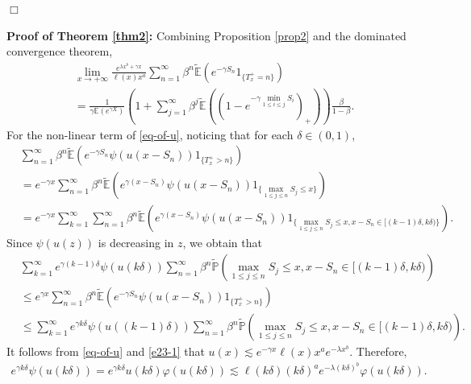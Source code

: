 \documentclass[11pt]{article}
\numberwithin{equation}{section}
\begin{document}
 
 \hfill$\Box$
 

 




\noindent
\textbf{Proof of Theorem \ref{thm2}:}  
Combining Proposition \ref{prop2} and the dominated convergence theorem, 
\begin{align}\label{e23-1}
	& \lim_{x\to+\infty} \frac{e^{\lambda x^b+ \gamma x}}{\ell(x)x^a  } \sum_{n=1}^\infty \beta^{n} \widetilde{\mathbb{E}}\left(e^{-\gamma S_n}1_{\{T_x^+=n\}}\right)\nonumber\\
	& = \frac{1}{\gamma \mathbb{E}(e^{\gamma X})} \left(1+ \sum_{j=1}^{\infty}\beta^j \widetilde{\mathbb{E}}\left( \left(1-e^{-\gamma \min_{1\leq i\leq j} S_i}\right)_+\right) \right)\frac{\beta}{1-\beta}.
\end{align}
For the non-linear term of \eqref{eq-of-u}, noticing that for each $\delta\in (0,1)$,
\begin{align}
	&\sum_{n=1}^\infty \beta^{n}\widetilde{\mathbb{E}}\left(e^{-\gamma S_n} \psi\left(u(x-S_n)\right)1_{\{T_x^+>n\}}\right)\nonumber\\
	&=e^{-\gamma x}\sum_{n=1}^\infty \beta^{n}\widetilde{\mathbb{E}}\left(e^{\gamma (x- S_n)} \psi\left(u(x-S_n)\right)1_{\{\max_{1\leq j \leq n} S_j \leq x\}}\right)\nonumber\\
	& = e^{-\gamma x}\sum_{k=1}^\infty \sum_{n=1}^\infty \beta^{n}\widetilde{\mathbb{E}}\left(e^{\gamma (x- S_n)} \psi\left(u(x-S_n)\right)1_{\{\max_{1\leq j \leq n} S_j \leq x, x-S_n\in [(k-1)\delta, k\delta) \}}\right).
\end{align}
Since $\psi(u(z))$ is decreasing in $z$, we obtain that 
\begin{align}\label{e31-1}
	& \sum_{k=1}^\infty e^{\gamma(k-1)\delta}\psi(u(k\delta))\sum_{n=1}^\infty \beta^{n}\widetilde{\mathbb{P}}\left( \max_{1\leq j \leq n} S_j \leq x, x-S_n\in [(k-1)\delta, k\delta) \right)\nonumber\\
	&  \leq e^{\gamma x} \sum_{n=1}^\infty \beta^{n}\widetilde{\mathbb{E}}\left(e^{-\gamma S_n} \psi\left(u(x-S_n)\right)1_{\{T_x^+>n\}}\right)  \nonumber\\
	&\leq  \sum_{k=1}^\infty e^{\gamma k\delta}\psi(u((k-1)\delta))\sum_{n=1}^\infty \beta^{n}\widetilde{\mathbb{P}}\left(\max_{1\leq j \leq n} S_j \leq x, x-S_n\in [(k-1)\delta, k\delta) \right).
\end{align}
It follows from \eqref{eq-of-u} and \eqref{e23-1} that $u(x)\lesssim e^{-\gamma x} \ell(x)x^a e^{-\lambda x^b}$. Therefore, 
\begin{align}\label{e31-2}
	e^{\gamma k\delta} \psi(u(k\delta))= e^{\gamma k\delta} u(k\delta) \varphi(u(k\delta)) \lesssim \ell(k\delta)(k\delta)^a e^{-\lambda (k\delta)^b}  \varphi(u(k\delta)).
\end{align}
\end{document}
